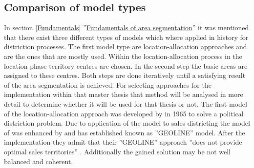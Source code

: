 \subsection{Comparison of model types}\label{comparison}
In section \ref{Fundamentals} ''\hyperref[Fundamentals]{Fundamentals of area segmentation}'' it was mentioned that there exist three different types of models which where applied in history for distriction processes. The first model type are location-allocation approaches and are the ones that are mostly used. Within the location-allocation process in the location phase territory centres are chosen. In the second step the basic areas are assigned to these centres. Both steps are done iteratively until a satisfying result of the area segmentation is achieved. For selecting approaches for the implementation within that master thesis that method will be analysed in more detail to determine whether it will be used for that thesis or not. The first model of the location-allocation approach was developed by \citeauthor{hess} \cite{hess} in 1965 to solve a political distriction problem. Due to application of the model to sales districting the model of \citeauthor{hess} was enhanced by \citeauthor{hessstuart} \cite{hessstuart} and has established known as ''GEOLINE'' model. After the implementation they admit that their ''GEOLINE'' approach ''does not provide optimal sales territories'' \cite{hessstuart}. Additionally the gained solution may be not well balanced and coherent.
